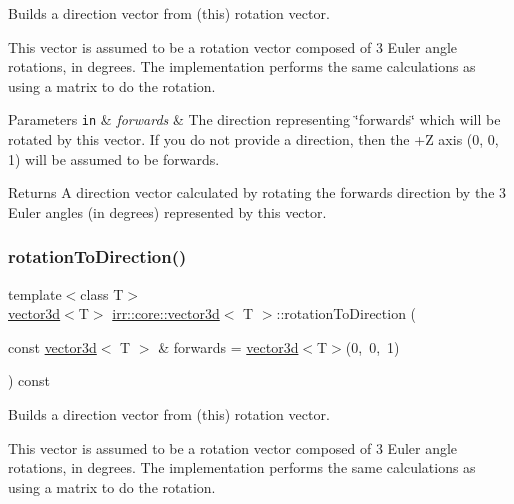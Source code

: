 Builds a direction vector from (this) rotation vector. 

This vector is assumed to be a rotation vector composed of 3 Euler angle rotations, in degrees. The implementation performs the same calculations as using a matrix to do the rotation.


\begin{DoxyParams}[1]{Parameters}
\mbox{\tt in}  & {\em forwards} & The direction representing \char`\"{}forwards\char`\"{} which will be rotated by this vector. If you do not provide a direction, then the +Z axis (0, 0, 1) will be assumed to be forwards. \\
\hline
\end{DoxyParams}
\begin{DoxyReturn}{Returns}
A direction vector calculated by rotating the forwards direction by the 3 Euler angles (in degrees) represented by this vector. 
\end{DoxyReturn}
\mbox{\label{classirr_1_1core_1_1vector3d_a53d222e7aace72513210bddb2b25376f}} 
\subsubsection{\texorpdfstring{rotation\+To\+Direction()}{rotationToDirection()}\hspace{0.1cm}{\footnotesize\ttfamily [2/2]}}
{\footnotesize\ttfamily template$<$class T$>$ \\
\hyperlink{classirr_1_1core_1_1vector3d}{vector3d}$<$T$>$ \hyperlink{classirr_1_1core_1_1vector3d}{irr\+::core\+::vector3d}$<$ T $>$\+::rotation\+To\+Direction (\begin{DoxyParamCaption}\item[{const \hyperlink{classirr_1_1core_1_1vector3d}{vector3d}$<$ T $>$ \&}]{forwards = {\ttfamily \hyperlink{classirr_1_1core_1_1vector3d}{vector3d}$<$T$>$(0,~0,~1)} }\end{DoxyParamCaption}) const\hspace{0.3cm}{\ttfamily [inline]}}



Builds a direction vector from (this) rotation vector. 

This vector is assumed to be a rotation vector composed of 3 Euler angle rotations, in degrees. The implementation performs the same calculations as using a matrix to do the rotation.


